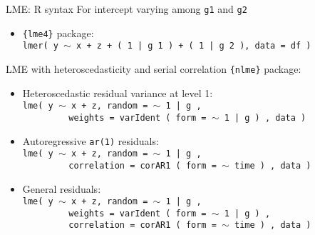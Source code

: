 \documentclass{beamer}
\begin{document}
\begin{frame}{LME: R syntax}
\small 
For intercept varying among \texttt{g1} and \texttt{g2} \\
\bigskip
\begin{itemize}
    \bigskip
    \item \texttt{\{lme4\}} package: \\ \medskip
    \texttt{lmer( y $\sim$ x + z + ( 1 | g 1 ) + ( 1 | g 2 ), data = df )}\\
\end{itemize}
\end{frame}
\begin{frame}{LME with heteroscedasticity and serial correlation}
\small 
\texttt{\{nlme\}} package: \\
\bigskip
\begin{itemize}
    \item Heteroscedastic residual variance at level 1:\\ \medskip
    \texttt{lme( y $\sim$ x + z, random = $\sim$ 1 |  g , \\
           ~~~~~~~~~weights = varIdent ( form = $\sim$ 1 | g ) , data  )}\\
    \bigskip
    \item Autoregressive \texttt{ar(1)} residuals:\\ \medskip
    \texttt{lme( y $\sim$ x + z, random = $\sim$ 1 |  g , \\
           ~~~~~~~~~correlation = corAR1 ( form = $\sim$ time ) , data  )}\\
    \bigskip
    \item General residuals:\\ \medskip
    \texttt{lme( y $\sim$ x + z, random = $\sim$ 1 |  g , \\
           ~~~~~~~~~weights = varIdent ( form = $\sim$ 1 | g ) , \\
           ~~~~~~~~~correlation = corAR1 ( form = $\sim$ time ) , data )}\\
\end{itemize}
\end{frame}
\end{document}
